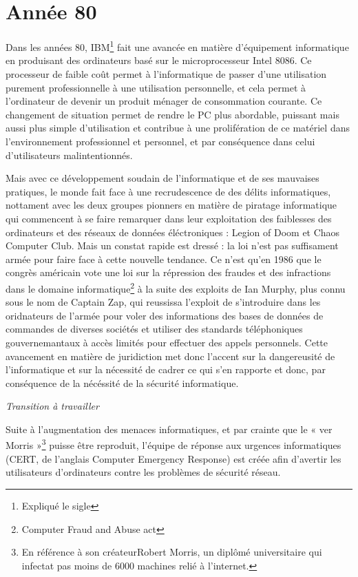 \documentclass[a4paper]{memoir}
\begin{document}
\section{Année 80}

Dans les années 80, IBM\footnote{Expliqué le sigle} fait une avancée en matière d'équipement informatique en produisant des ordinateurs basé sur le microprocesseur Intel 8086. Ce processeur de faible coût permet à l'informatique de passer d'une utilisation purement professionnelle à une utilisation personnelle, et cela permet à l'ordinateur de devenir un produit ménager de consommation courante. Ce changement de situation permet de rendre le PC plus abordable, puissant mais aussi plus simple d'utilisation et contribue à une prolifération de ce matériel dans l'environnement professionnel et personnel, et par conséquence dans celui d'utilisateurs malintentionnés.

Mais avec ce développement soudain de l'informatique et de ses mauvaises pratiques, le monde fait face à une recrudescence de des délits informatiques, nottament avec les deux groupes pionners en matière de piratage informatique qui commencent à se faire remarquer dans leur exploitation des faiblesses des ordinateurs et des réseaux de données éléctroniques : Legion of Doom et Chaos Computer Club. Mais un constat rapide est dressé : la loi n'est pas suffisament armée pour faire face à cette nouvelle tendance. Ce n'est qu'en 1986 que le congrès américain vote une loi sur la répression des fraudes et des infractions dans le domaine informatique\footnote{Computer Fraud and Abuse act} à la suite des exploits de Ian Murphy, plus connu sous le nom de Captain Zap, qui reussissa l'exploit de s'introduire dans les oridnateurs de l'armée pour voler des informations des bases de données de commandes de diverses sociétés et utiliser des standards téléphoniques gouvernemantaux à accès limités pour effectuer des appels personnels. 
Cette avancement en matière de juridiction met donc l'accent sur la dangereusité de l'informatique et sur la nécessité de cadrer ce qui s'en rapporte et donc, par conséquence de la nécéssité de la sécurité informatique.

\textit{Transition à travailler}

Suite à l'augmentation des menaces informatiques, et par crainte que le « ver Morris »\footnote{En référence à son créateurRobert Morris, un diplômé universitaire qui infectat pas moins de 6000 machines relié à l'internet.} puisse être reproduit, l'équipe de réponse aux urgences informatiques (CERT, de l'anglais Computer Emergency Response) est créée afin d'avertir les utilisateurs d'ordinateurs contre les problèmes de sécurité réseau.
\end{document}
